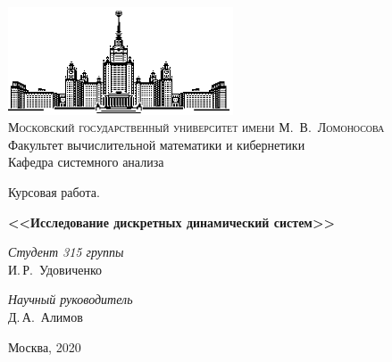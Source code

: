 \documentclass{subfiles}
\begin{document}
\thispagestyle{empty}

\begin{center}
\ \vspace{-3cm}

\includegraphics[width=0.5\textwidth]{msu.eps}\\
{\scshape Московский государственный университет имени М.~В.~Ломоносова}\\
Факультет вычислительной математики и кибернетики\\
Кафедра системного анализа

\vfill

{\LARGE Курсовая работа.}

\vspace{1cm}

{\Huge\bfseries <<Исследование дискретных динамический систем>>}
\end{center}

\vspace{1cm}

\begin{flushright}
  \large
  \textit{Студент 315 группы}\\
  И.\,Р.~Удовиченко

  \vspace{5mm}

  \textit{Научный руководитель}\\
  Д.\,А.~Алимов
\end{flushright}

\vfill

\begin{center}
Москва, 2020
\end{center}

\newpage
\end{document}
